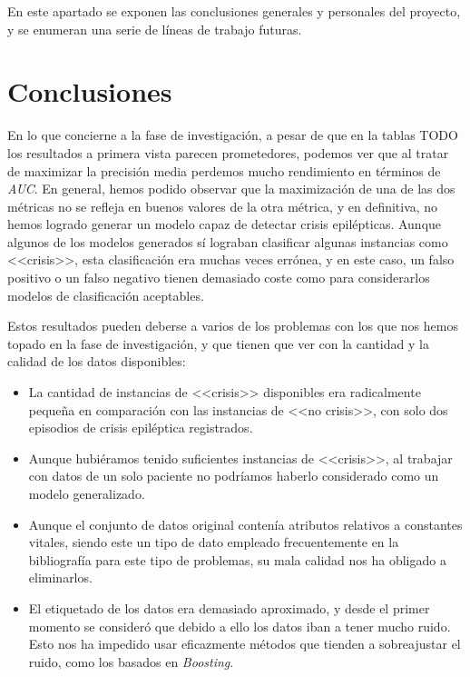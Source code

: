 
En este apartado se exponen las conclusiones generales y personales del proyecto, y se enumeran una serie de líneas de trabajo futuras. 

\section{Conclusiones}

En lo que concierne a la fase de investigación, a pesar de que en la tablas TODO los resultados a primera vista parecen prometedores, podemos ver que al tratar de maximizar la precisión media perdemos mucho rendimiento en términos de \textit{AUC}. En general, hemos podido observar que la maximización de una de las dos métricas no se refleja en buenos valores de la otra métrica, y en definitiva, no hemos logrado generar un modelo capaz de detectar crisis epilépticas. Aunque algunos de los modelos generados sí lograban clasificar algunas instancias como <<crisis>>, esta clasificación era muchas veces errónea, y en este caso, un falso positivo o un falso negativo tienen demasiado coste como para considerarlos modelos de clasificación aceptables. 

Estos resultados pueden deberse a varios de los problemas con los que nos hemos topado en la fase de investigación, y que tienen que ver con la cantidad y la calidad de los datos disponibles: 

\begin{itemize}
	\item La cantidad de instancias de <<crisis>> disponibles era radicalmente pequeña en comparación con las instancias de <<no crisis>>, con solo dos episodios de crisis epiléptica registrados. 
	\item Aunque hubiéramos tenido suficientes instancias de <<crisis>>, al trabajar con datos de un solo paciente no podríamos haberlo considerado como un modelo generalizado. 
	\item Aunque el conjunto de datos original contenía atributos relativos a constantes vitales, siendo este un tipo de dato empleado frecuentemente en la bibliografía para este tipo de problemas, su mala calidad nos ha obligado a eliminarlos. 
	\item El etiquetado de los datos era demasiado aproximado, y desde el primer momento se consideró que debido a ello los datos iban a tener mucho ruido. Esto nos ha impedido usar eficazmente métodos que tienden a sobreajustar el ruido, como los basados en \textit{Boosting}. 
\end{itemize}

